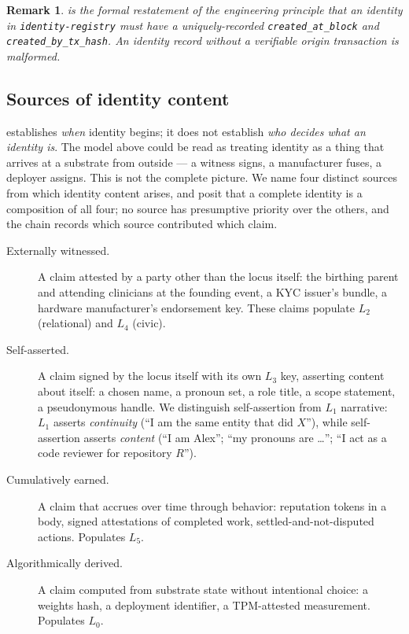 \documentclass[11pt,a4paper,parskip=half-,DIV=12,headings=standardclasses]{scrartcl}
\theoremstyle{ncthm}
\theoremstyle{ncdef}
\newtheorem{remark}[theorem]{Remark}
\begin{document}
\begin{remark}
 is the formal restatement of the
engineering principle that an identity in \texttt{identity-registry}
\cite{paraxiom-identity-registry} must have a uniquely-recorded
\texttt{created\_at\_block} and \texttt{created\_by\_tx\_hash}.
An identity record without a verifiable origin transaction is
malformed.
\end{remark}

\subsection{Sources of identity content}\label{subsec:sources}

 establishes \emph{when} identity
begins; it does not establish \emph{who decides what an identity is}.
The model above could be read as treating identity as a thing that
arrives at a substrate from outside --- a witness signs, a
manufacturer fuses, a deployer assigns. This is not the complete
picture. We name four distinct sources from which identity content
arises, and posit that a complete identity is a composition of all
four; no source has presumptive priority over the others, and the
chain records which source contributed which claim.

\begin{description}
\item[Externally witnessed.] A claim attested by a party other than
  the locus itself: the birthing parent and attending clinicians at
  the founding event, a KYC issuer's bundle, a hardware manufacturer's
  endorsement key. These claims populate $L_2$ (relational) and $L_4$
  (civic).
\item[Self-asserted.] A claim signed by the locus itself with its own
  $L_3$ key, asserting content about itself: a chosen name, a pronoun
  set, a role title, a scope statement, a pseudonymous handle. We
  distinguish self-assertion from $L_1$ narrative: $L_1$ asserts
  \emph{continuity} (``I am the same entity that did $X$''), while
  self-assertion asserts \emph{content} (``I am Alex''; ``my pronouns
  are \ldots''; ``I act as a code reviewer for repository $R$'').
\item[Cumulatively earned.] A claim that accrues over time through
  behavior: reputation tokens in a body, signed attestations of
  completed work, settled-and-not-disputed actions. Populates $L_5$.
\item[Algorithmically derived.] A claim computed from substrate state
  without intentional choice: a weights hash, a deployment identifier,
  a TPM-attested measurement. Populates $L_0$.
\end{description}
\end{document}
